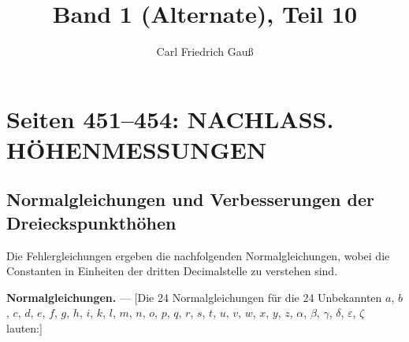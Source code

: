 \documentclass[12pt,a4paper]{article}
\title{Band 1 (Alternate), Teil 10}
\author{Carl Friedrich Gau\ss}
\date{}
\theoremstyle{plain}
\theoremstyle{definition}
\theoremstyle{remark}
\begin{document}
\maketitle

\section*{Seiten 451--454: NACHLASS. H\"OHENMESSUNGEN}
\label{sec:hoehenmessungen}

\subsection*{Normalgleichungen und Verbesserungen der Dreieckspunkth\"ohen}

\noindent
Die Fehlergleichungen ergeben die nachfolgenden Normalgleichungen, wobei die Constanten in Einheiten der dritten Decimalstelle zu verstehen sind.

\medskip
\noindent
\textbf{Normalgleichungen.} --- [Die 24 Normalgleichungen f\"ur die 24 Unbekannten $a$, $b$, $c$, $d$, $e$, $f$, $g$, $h$, $i$, $k$, $l$, $m$, $n$, $o$, $p$, $q$, $r$, $s$, $t$, $u$, $v$, $w$, $x$, $y$, $z$, $\alpha$, $\beta$, $\gamma$, $\delta$, $\varepsilon$, $\zeta$ lauten:]
\end{document}
